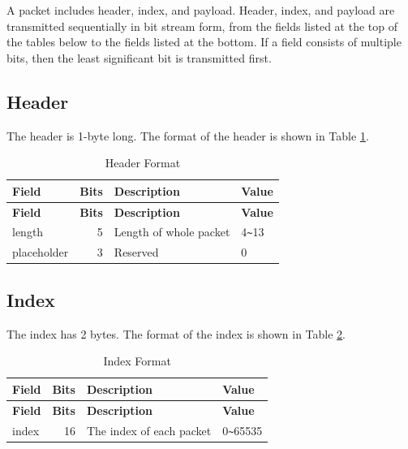 \documentclass[main\_\_EN.tex]{subfiles}
\begin{document}
A packet includes header, index, and payload. Header, index, and payload are transmitted sequentially in bit stream form, from the fields listed at the top of the tables below to the fields listed at the bottom. If a field consists of multiple bits, then the least significant bit is transmitted first.




\subsection{Header}

The header is 1-byte long. The format of the header is shown in Table \ref{tab:header}.


\begin{longtable}[c]{ |l|r|l|l| }
    \caption{Header Format}
    \label{tab:header}
    \\\hline\rowcolor{lightgray}
    \textbf{Field} & \textbf{Bits} & \textbf{Description} & \textbf{Value}\\\hline
    \endfirsthead
    \textbf{Field} & \textbf{Bits} & \textbf{Description} & \textbf{Value}\\\hline
    \endhead
    \endfoot
    \endlastfoot

    length & 5 & Length of whole packet & 4\verb+~+13 \\\hline
    placeholder & 3 & Reserved & 0 \\\hline
 \end{longtable}


\subsection{Index}

The index has 2 bytes. The format of the index is shown in Table \ref{tab:index}.

\begin{longtable}[c]{ |l|r|l|l| }
    \caption{Index Format}
    \label{tab:index}
    \\\hline\rowcolor{lightgray}
    \textbf{Field} & \textbf{Bits} & \textbf{Description} & \textbf{Value}\\\hline
    \endfirsthead
    \textbf{Field} & \textbf{Bits} & \textbf{Description} & \textbf{Value}\\\hline
    \endhead
    \endfoot
    \endlastfoot

    index & 16 & The index of each packet & 0\verb+~+65535 \\\hline
 \end{longtable}
\end{document}
